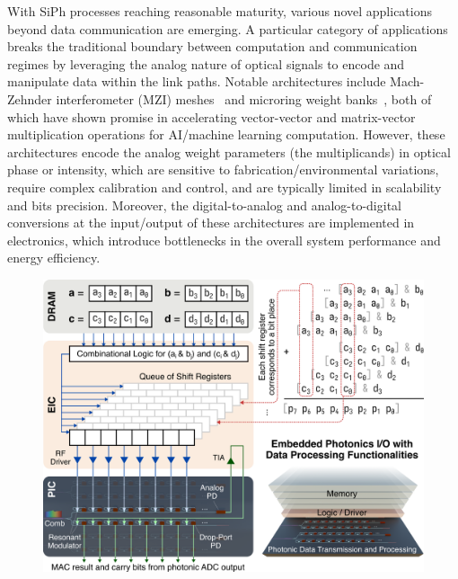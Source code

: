 With SiPh processes reaching reasonable maturity, various novel applications beyond data communication are emerging. A particular category of applications breaks the traditional boundary between computation and communication regimes by leveraging the analog nature of optical signals to encode and manipulate data within the link paths. Notable architectures include Mach-Zehnder interferometer (MZI) meshes~\cite{shenDeepLearningCoherent2017} and microring weight banks~\cite{taitMicroringWeightBanks2016}, both of which have shown promise in accelerating vector-vector and matrix-vector multiplication operations for AI/machine learning computation. However, these architectures encode the analog weight parameters (the multiplicands) in optical phase or intensity, which are sensitive to fabrication/environmental variations, require complex calibration and control, and are typically limited in scalability and bits precision. Moreover, the digital-to-analog and analog-to-digital conversions at the input/output of these architectures are implemented in electronics, which introduce bottlenecks in the overall system performance and energy efficiency.

\begin{figure}
    \vspace{-1em}
    \begin{center}
        \includegraphics[width=\linewidth]{../../6_figures/rs_fig_3_comppho.png}
    \end{center}
    \caption{}
    \label{fig:pho_computing}
    \vspace{-0.5em}
\end{figure}

